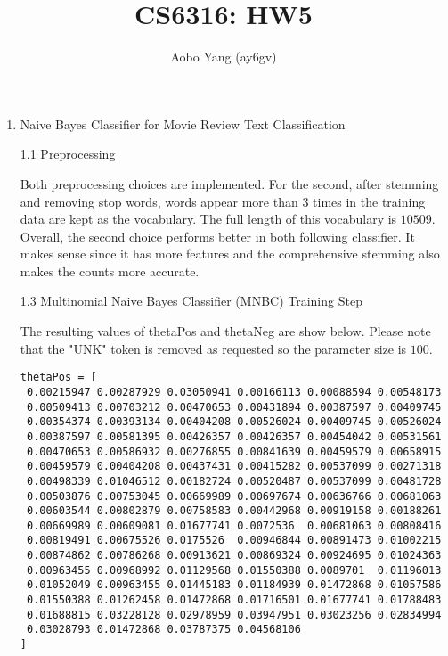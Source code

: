 \documentclass[11pt]{article}
\begin{document}
\author{Aobo Yang (ay6gv)}
\title{CS6316: HW5}
\maketitle

\medskip

\begin{enumerate}

\item
Naive Bayes Classifier for Movie Review Text Classification

1.1 Preprocessing

\medskip

Both preprocessing choices are implemented. For the second, after stemming and removing stop words, words appear more than $3$ times in the training data are kept as the vocabulary. The full length of this vocabulary is $10509$. Overall, the second choice performs better in both following classifier. It makes sense since it has more features and the comprehensive stemming also makes the counts more accurate.

\medskip

1.3 Multinomial Naive Bayes Classifier (MNBC) Training Step

\medskip

The resulting values of thetaPos and thetaNeg are show below. Please note that the "UNK" token is removed as requested so the parameter size is $100$.

\begin{verbatim}
thetaPos = [
 0.00215947 0.00287929 0.03050941 0.00166113 0.00088594 0.00548173
 0.00509413 0.00703212 0.00470653 0.00431894 0.00387597 0.00409745
 0.00354374 0.00393134 0.00404208 0.00526024 0.00409745 0.00526024
 0.00387597 0.00581395 0.00426357 0.00426357 0.00454042 0.00531561
 0.00470653 0.00586932 0.00276855 0.00841639 0.00459579 0.00658915
 0.00459579 0.00404208 0.00437431 0.00415282 0.00537099 0.00271318
 0.00498339 0.01046512 0.00182724 0.00520487 0.00537099 0.00481728
 0.00503876 0.00753045 0.00669989 0.00697674 0.00636766 0.00681063
 0.00603544 0.00802879 0.00758583 0.00442968 0.00919158 0.00188261
 0.00669989 0.00609081 0.01677741 0.0072536  0.00681063 0.00808416
 0.00819491 0.00675526 0.0175526  0.00946844 0.00891473 0.01002215
 0.00874862 0.00786268 0.00913621 0.00869324 0.00924695 0.01024363
 0.00963455 0.00968992 0.01129568 0.01550388 0.0089701  0.01196013
 0.01052049 0.00963455 0.01445183 0.01184939 0.01472868 0.01057586
 0.01550388 0.01262458 0.01472868 0.01716501 0.01677741 0.01788483
 0.01688815 0.03228128 0.02978959 0.03947951 0.03023256 0.02834994
 0.03028793 0.01472868 0.03787375 0.04568106
]
\end{verbatim}


\end{enumerate}
\end{document}
